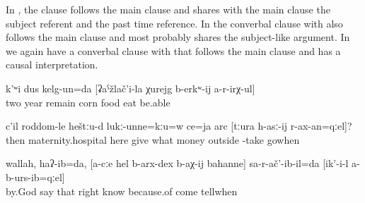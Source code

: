 In , the  clause follows the main clause and shares with the main clause the subject referent and the past time reference. In  the converbal clause with  also follows the main clause and most probably shares the subject-like argument. In  we again have a converbal clause with  that follows the main clause and has a causal interpretation.
%
\begin{exe}
	\ex	\label{ex:‎‎‎I remained there for two years, unable to eat food made of corn}
	\gll	k'ʷi	dus	kelg-un=da		[ʡaˁžlač'i-la	χurejg	b-erkʷ-ij	a-r-irχ-ul]\\
		two	year	remain	corn	food	eat	be.able\\
	\glt	{}

	\ex	\label{ex:Then, in the maternity hospital, here you do not give money when you go to take (the child) out (of the hospital and home)}
	\gll	c'il	roddom-le	heštːu-d	lukː-unne=kːu=w	ce=ja	arc	[tːura	h-asː-ij	r-ax-an=qːel]?\\
		then	maternity.hospital	here	give	what	money		outside	-take	gowhen\\
	\glt	{}

	\ex	\label{ex:‎‎‎I came to know the truth from you, I said, because he (the other doctor) did not tell me (the truth)}
	\gll	wallah,	haʔ-ib=da,	[a-cːe	hel	b-arx-dex	b-aχ-ij	bahanne]	sa-r-ač'-ib-il=da		[ik'-i-l	a-b-urs-ib=qːel]\\
		by.God	say		that	\tsc{n-}right	know	because.of	come		tellwhen\\
	\glt	{}
\end{exe}

